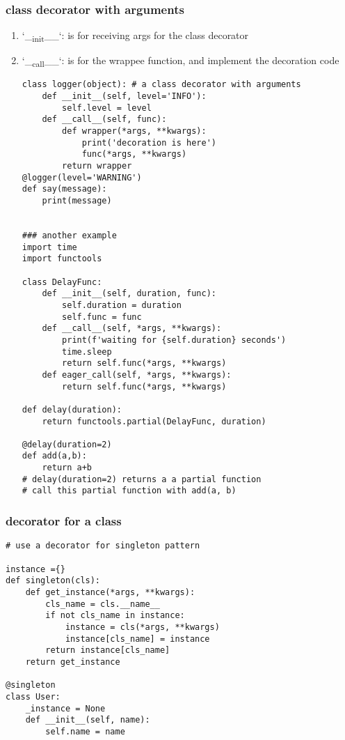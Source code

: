 \documentclass[11pt]{article}
\begin{document}
\subsubsection{class decorator with arguments}
\label{sec:org347e9b6}
\begin{enumerate}
\item `\_\textsubscript{init}\_\_`: is for receiving args for the class decorator
\label{sec:org1679333}
\item `\_\textsubscript{call}\_\_`: is for the wrappee function, and implement the decoration code
\label{sec:org7fa3dd6}

\begin{verbatim}
class logger(object): # a class decorator with arguments
    def __init__(self, level='INFO'):
        self.level = level
    def __call__(self, func):
        def wrapper(*args, **kwargs):
            print('decoration is here')
            func(*args, **kwargs)
        return wrapper
@logger(level='WARNING')
def say(message):
    print(message)


### another example
import time
import functools

class DelayFunc:
    def __init__(self, duration, func):
        self.duration = duration
        self.func = func
    def __call__(self, *args, **kwargs):
        print(f'waiting for {self.duration} seconds')
        time.sleep
        return self.func(*args, **kwargs)
    def eager_call(self, *args, **kwargs):
        return self.func(*args, **kwargs)

def delay(duration):
    return functools.partial(DelayFunc, duration)

@delay(duration=2)
def add(a,b):
    return a+b
# delay(duration=2) returns a a partial function
# call this partial function with add(a, b)
\end{verbatim}
\end{enumerate}
\subsubsection{decorator for a class}
\label{sec:orgc74f06f}
\begin{verbatim}
# use a decorator for singleton pattern

instance ={}
def singleton(cls):
    def get_instance(*args, **kwargs):
        cls_name = cls.__name__
        if not cls_name in instance:
            instance = cls(*args, **kwargs)
            instance[cls_name] = instance
        return instance[cls_name]
    return get_instance

@singleton
class User:
    _instance = None
    def __init__(self, name):
        self.name = name

\end{verbatim}
\end{document}
